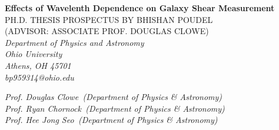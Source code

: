 \documentclass[12pt, preprint,letterpaper]{article}
\begin{document}
%
%
%
\thispagestyle{empty}
\begin{center}
\textbf{Effects of Wavelenth Dependence on Galaxy Shear Measurement} \\

\vspace{2cm}
PH.D. THESIS PROSPECTUS BY BHISHAN POUDEL \\
(ADVISOR: ASSOCIATE PROF. DOUGLAS CLOWE) \\

\vspace{3cm}
\it{
Department of Physics and Astronomy\\
Ohio University\\
Athens, OH 45701\\
\vspace{2cm}
bp959314@ohio.edu\\
}


\vspace{3cm}
\it{
Prof. Douglas Clowe\,  \hspace{2mm} (Department of Physics \& Astronomy)\\
Prof. Ryan Chornock\,  \hspace{2mm} (Department of Physics \& Astronomy)\\
Prof. Hee Jong Seo\, \hspace{3mm} (Department of Physics \& Astronomy)
}

\end{center}
%
%
%
%
\clearpage
\tableofcontents
\listoffigures 
\listoftables
\clearpage{}
%
%
\end{document}
